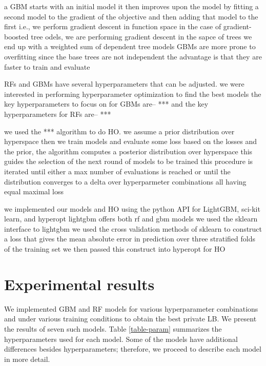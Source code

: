 \documentclass[12pt]{article}
\begin{document}
a GBM starts with an initial model
it then improves upon the model by fitting a second model to the gradient of the objective and then adding that model to the first
i.e., we perform gradient descent in function space
in the case of gradient-boosted tree odels,
we are performing gradient descent in the sapce of trees
we end up with a weighted sum of dependent tree models
GBMs are more prone to overfitting since the base trees are not independent
the advantage is that they are faster to train and evaluate

RFs and GBMs have several hyperparameters that can be adjusted. we were interested in performing hyperparameter optimization to find the best models
the key hyperparameters to focus on for GBMs are--
***
and the key hyperparameters for RFs are--
***

we used the *** algorithm to do HO.
we assume a prior distribution over hyperspace
then we train models and evaluate some loss
based on the losses and the prior, the algorithm computes a posterior distribution over hyperspace
this guides the selection of the next round of models to be trained
this procedure is iterated until either a max number of evaluations is reached or until the distribution converges to a delta over hyperparmeter combinations all having equal maximal loss

we implemented our models and HO using the python API for LightGBM, sci-kit learn, and hyperopt
lightgbm offers both rf and gbm models
we used the sklearn interface to lightgbm
we used the cross validation methods of sklearn to construct a loss that gives the mean absolute error in prediction over three stratified folds of the training set
we then passed this construct into hyperopt for HO

\section{Experimental results}

We implemented GBM and RF models for various hyperparameter combinations and under various training conditions to obtain the best private LB. We present the results of seven such models. Table \ref{table-param} summarizes the hyperparameters used for each model. Some of the models have additional differences besides hyperparameters; therefore, we proceed to describe each model in more detail.
\end{document}
